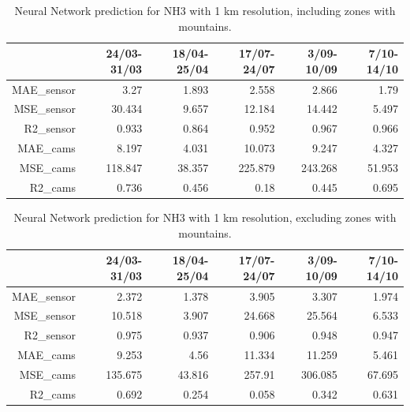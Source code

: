 \begin{table}[H]
\begin{tabular}{rrrrrr}
\hline
    &   24/03-31/03 &   18/04-25/04 &   17/07-24/07 &   3/09-10/09 &   7/10-14/10 \\
\hline
  MAE\_sensor   &            3.27  &            1.893 &            2.558 &            2.866 &            1.79  \\
  MSE\_sensor   &           30.434 &            9.657 &           12.184 &           14.442 &            5.497 \\
  R2\_sensor    &            0.933 &            0.864 &            0.952 &            0.967 &            0.966 \\
  MAE\_cams     &            8.197 &            4.031 &           10.073 &            9.247 &            4.327 \\
  MSE\_cams     &          118.847 &           38.357 &          225.879 &          243.268 &           51.953 \\
  R2\_cams      &            0.736 &            0.456 &            0.18  &            0.445 &            0.695 \\
\hline
\end{tabular}
\caption{Neural Network prediction for NH3 with 1 km resolution, including zones with mountains.}
\end{table}


\begin{table}[H]
\begin{tabular}{rrrrrr}
\hline
    &   24/03-31/03 &   18/04-25/04 &   17/07-24/07 &   3/09-10/09 &   7/10-14/10 \\
\hline
  MAE\_sensor   &            2.372 &            1.378 &            3.905 &            3.307 &            1.974 \\
  MSE\_sensor   &           10.518 &            3.907 &           24.668 &           25.564 &            6.533 \\
  R2\_sensor    &            0.975 &            0.937 &            0.906 &            0.948 &            0.947 \\
  MAE\_cams     &            9.253 &            4.56  &           11.334 &           11.259 &            5.461 \\
  MSE\_cams     &          135.675 &           43.816 &          257.91  &          306.085 &           67.695 \\
  R2\_cams      &            0.692 &            0.254 &            0.058 &            0.342 &            0.631 \\
\hline
\end{tabular}
\caption{Neural Network prediction for NH3 with 1 km resolution, excluding zones with mountains.}
\end{table}









